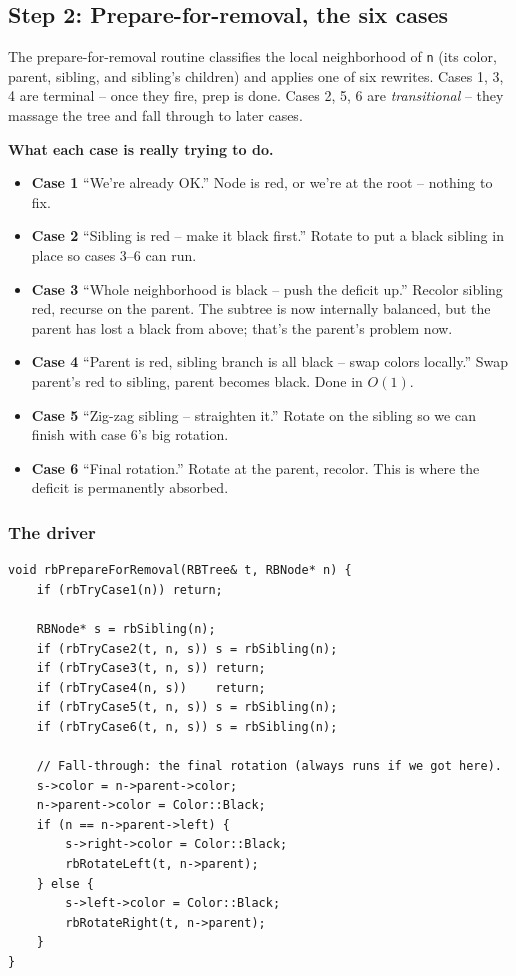 \documentclass[11pt]{article}
\begin{document}
\subsection*{Step 2: Prepare-for-removal, the six cases}

The prepare-for-removal routine classifies the local neighborhood of \texttt{n} (its color, parent, sibling, and sibling's children) and applies one of six rewrites. Cases 1, 3, 4 are terminal -- once they fire, prep is done. Cases 2, 5, 6 are \emph{transitional} -- they massage the tree and fall through to later cases.

\begin{examplebox}
\textbf{What each case is really trying to do.}
\begin{itemize}[leftmargin=*]
    \item \textbf{Case 1} ``We're already OK.'' Node is red, or we're at the root -- nothing to fix.
    \item \textbf{Case 2} ``Sibling is red -- make it black first.'' Rotate to put a black sibling in place so cases 3--6 can run.
    \item \textbf{Case 3} ``Whole neighborhood is black -- push the deficit up.'' Recolor sibling red, recurse on the parent. The subtree is now internally balanced, but the parent has lost a black from above; that's the parent's problem now.
    \item \textbf{Case 4} ``Parent is red, sibling branch is all black -- swap colors locally.'' Swap parent's red to sibling, parent becomes black. Done in $O(1)$.
    \item \textbf{Case 5} ``Zig-zag sibling -- straighten it.'' Rotate on the sibling so we can finish with case 6's big rotation.
    \item \textbf{Case 6} ``Final rotation.'' Rotate at the parent, recolor. This is where the deficit is permanently absorbed.
\end{itemize}
\end{examplebox}

\subsubsection*{The driver}

\begin{lstlisting}[basicstyle=\ttfamily\small,frame=single]
void rbPrepareForRemoval(RBTree& t, RBNode* n) {
    if (rbTryCase1(n)) return;

    RBNode* s = rbSibling(n);
    if (rbTryCase2(t, n, s)) s = rbSibling(n);
    if (rbTryCase3(t, n, s)) return;
    if (rbTryCase4(n, s))    return;
    if (rbTryCase5(t, n, s)) s = rbSibling(n);
    if (rbTryCase6(t, n, s)) s = rbSibling(n);

    // Fall-through: the final rotation (always runs if we got here).
    s->color = n->parent->color;
    n->parent->color = Color::Black;
    if (n == n->parent->left) {
        s->right->color = Color::Black;
        rbRotateLeft(t, n->parent);
    } else {
        s->left->color = Color::Black;
        rbRotateRight(t, n->parent);
    }
}
\end{lstlisting}
\end{document}
